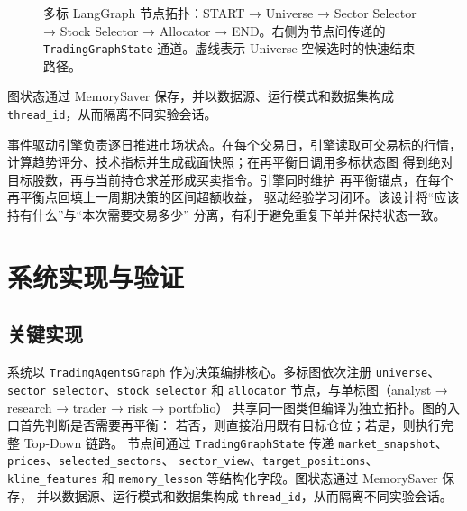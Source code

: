 \documentclass[a4paper,11pt]{article}
\begin{document}
\begin{figure}[H]
\caption{多标 LangGraph 节点拓扑：START → Universe → Sector Selector → Stock Selector → Allocator → END。右侧为节点间传递的 \texttt{TradingGraphState} 通道。虚线表示 Universe 空候选时的快速结束路径。}
\label{fig:langgraph-topology}
\end{figure}

图状态通过 MemorySaver 保存，并以数据源、运行模式和数据集构成
\texttt{thread\_id}，从而隔离不同实验会话。

事件驱动引擎负责逐日推进市场状态。在每个交易日，引擎读取可交易标的行情，
计算趋势评分、技术指标并生成截面快照；在再平衡日调用多标状态图
得到绝对目标股数，再与当前持仓求差形成买卖指令。引擎同时维护
再平衡锚点，在每个再平衡点回填上一周期决策的区间超额收益，
驱动经验学习闭环。该设计将``应该持有什么''与``本次需要交易多少''
分离，有利于避免重复下单并保持状态一致。

\section{系统实现与验证}

\subsection{关键实现}

系统以 \texttt{TradingAgentsGraph} 作为决策编排核心。多标图依次注册
\texttt{universe}、\texttt{sector\_selector}、\texttt{stock\_selector} 和
\texttt{allocator} 节点，与单标图（analyst → research → trader → risk → portfolio）
共享同一图类但编译为独立拓扑。图的入口首先判断是否需要再平衡：
若否，则直接沿用既有目标仓位；若是，则执行完整 Top-Down 链路。
节点间通过 \texttt{TradingGraphState} 传递
\texttt{market\_snapshot}、\texttt{prices}、\texttt{selected\_sectors}、
\texttt{sector\_view}、\texttt{target\_positions}、\texttt{kline\_features}
和 \texttt{memory\_lesson} 等结构化字段。图状态通过 MemorySaver 保存，
并以数据源、运行模式和数据集构成 \texttt{thread\_id}，从而隔离不同实验会话。
\end{document}
